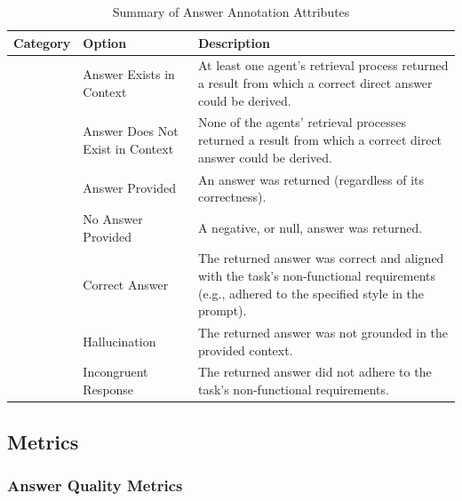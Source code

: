 \documentclass[sigconf,nonacm]{acmart}
\begin{document}
{
  \setlength{\tabcolsep}{8pt}      %
  \renewcommand{\arraystretch}{1.2} %

  \begin{table}[h]
  \centering
  \begin{tabularx}{\textwidth}{|>{\raggedright\arraybackslash}p{2.5cm}|>{\raggedright\arraybackslash}p{3cm}|X|}
  \hline
  \textbf{Category} & \textbf{Option} & \textbf{Description} \\ \hline
  \multirow{2}{2.5cm}{\raggedright Context Availability} 
      & Answer Exists in Context 
      & At least one agent’s retrieval process returned a result from which a correct direct answer could be derived. \\ \cline{2-3}
      & Answer Does Not Exist in Context 
      & None of the agents’ retrieval processes returned a result from which a correct direct answer could be derived. \\ \hline
  \multirow{2}{2.5cm}{\raggedright Answer Provision} 
      & Answer Provided 
      & An answer was returned (regardless of its correctness). \\ \cline{2-3}
      & No Answer Provided 
      & A negative, or null, answer was returned. \\ \hline
  \multirow{3}{2.5cm}{\raggedright Answer Quality} 
      & Correct Answer 
      & The returned answer was correct and aligned with the task’s non-functional requirements (e.g., adhered to the specified style in the prompt). \\ \cline{2-3}
      & Hallucination 
      & The returned answer was not grounded in the provided context. \\ \cline{2-3}
      & Incongruent Response 
      & The returned answer did not adhere to the task’s non-functional requirements. \\ \hline
  \end{tabularx}
  \caption{Summary of Answer Annotation Attributes}
  \label{tab:qa_annotation}
  \end{table}
}



\subsection{Metrics}
\subsubsection{Answer Quality Metrics}
\label{sub:aq_metrics}
\end{document}
